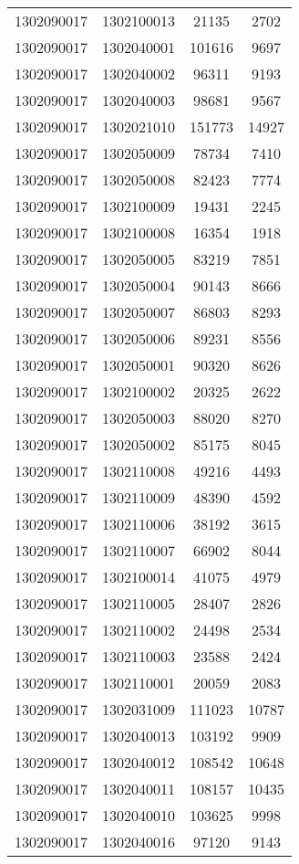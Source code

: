 \begin{longtable}[h]{llcc}
		1302090017 & 1302100013 & 21135 & 2702\\
		1302090017 & 1302040001 & 101616 & 9697\\
		1302090017 & 1302040002 & 96311 & 9193\\
		1302090017 & 1302040003 & 98681 & 9567\\
		1302090017 & 1302021010 & 151773 & 14927\\
		1302090017 & 1302050009 & 78734 & 7410\\
		1302090017 & 1302050008 & 82423 & 7774\\
		1302090017 & 1302100009 & 19431 & 2245\\
		1302090017 & 1302100008 & 16354 & 1918\\
		1302090017 & 1302050005 & 83219 & 7851\\
		1302090017 & 1302050004 & 90143 & 8666\\
		1302090017 & 1302050007 & 86803 & 8293\\
		1302090017 & 1302050006 & 89231 & 8556\\
		1302090017 & 1302050001 & 90320 & 8626\\
		1302090017 & 1302100002 & 20325 & 2622\\
		1302090017 & 1302050003 & 88020 & 8270\\
		1302090017 & 1302050002 & 85175 & 8045\\
		1302090017 & 1302110008 & 49216 & 4493\\
		1302090017 & 1302110009 & 48390 & 4592\\
		1302090017 & 1302110006 & 38192 & 3615\\
		1302090017 & 1302110007 & 66902 & 8044\\
		1302090017 & 1302100014 & 41075 & 4979\\
		1302090017 & 1302110005 & 28407 & 2826\\
		1302090017 & 1302110002 & 24498 & 2534\\
		1302090017 & 1302110003 & 23588 & 2424\\
		1302090017 & 1302110001 & 20059 & 2083\\
		1302090017 & 1302031009 & 111023 & 10787\\
		1302090017 & 1302040013 & 103192 & 9909\\
		1302090017 & 1302040012 & 108542 & 10648\\
		1302090017 & 1302040011 & 108157 & 10435\\
		1302090017 & 1302040010 & 103625 & 9998\\
		1302090017 & 1302040016 & 97120 & 9143\\

\end{longtable}
